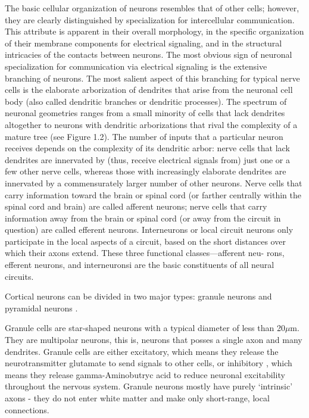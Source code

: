The basic cellular organization of neurons resembles that of other cells; however, they are clearly distinguished by specialization for intercellular communication.
This attribute is apparent in their overall morphology, in the specific organization of their membrane components for electrical signaling, and in the structural intricacies of the contacts between neurons.
The most obvious sign of neuronal specialization for communication via electrical signaling is the extensive branching of neurons.
The most salient aspect of this branching for typical nerve cells is the elaborate arborization of dendrites that arise from the neuronal cell body (also called dendritic branches or dendritic processes).
The spectrum of neuronal geometries ranges from a small minority of cells that lack dendrites altogether to neurons with dendritic arborizations that rival the complexity of a mature tree (see Figure 1.2).
The number of inputs that a particular neuron receives depends on the complexity of its dendritic arbor: nerve cells that lack dendrites are innervated by (thus, receive electrical signals from) just one or a few other nerve cells, whereas those with increasingly elaborate dendrites are innervated by a commensurately larger number of other neurons.
Nerve cells that carry information toward the brain or spinal cord (or farther centrally within the spinal cord and brain) are called afferent neurons; nerve cells that carry information away from the brain or spinal cord (or away from the circuit in question) are called efferent neurons. Interneurons or local circuit neurons only participate in the local aspects of a circuit, based on the short distances over which their axons extend. These three functional classes—afferent neu- rons, efferent neurons, and interneuronsi are the basic constituents of all neural circuits.

Cortical neurons can be divided in two major types: granule neurons and pyramidal neurons \cite{Johns}.

Granule cells are star-shaped neurons with a typical diameter of less than 20$\mu$m.
They are multipolar neurons, this is, neurons that posses a single axon and many dendrites.
Granule cells are either excitatory, which means they release the neurotransmitter glutamate to send signals to other cells, or inhibitory \cite{Bekkers2011}, which means they release gamma-Aminobutryc acid to reduce neuronal excitability throughout the nervous system.
Granule neurons mostly have purely ‘intrinsic’ axons - they do not enter white matter and make only short-range, local connections.

